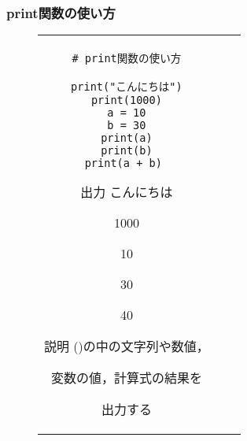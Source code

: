 \documentclass{jsarticle}
\begin{document}
\subsubsection{print関数の使い方} \vspace{-5mm}
\begin{figure}[h]
	\begin{tabular}{ccc}
		\begin{minipage}[t]{.4\textwidth}
			\begin{lstlisting}[caption=print関数]
# print関数の使い方

print("こんにちは")
print(1000)
a = 10
b = 30
print(a)
print(b)
print(a + b) \end{lstlisting}
		\end{minipage} \hspace{5mm}
		\begin{minipage}[t]{.15\textwidth}
			\begin{itembox}[l]{出力}
				こんにちは \par
				1000 \par
				10 \par
				30 \par
				40 \par
			\end{itembox}
		\end{minipage} \hspace{5mm}
		\begin{minipage}[t]{.3\textwidth}
			\begin{itembox}[l]{説明}
				()の中の文字列や数値，\par 変数の値，計算式の結果を \par
				出力する
			\end{itembox}
		\end{minipage}
	\end{tabular}
\end{figure}
\end{document}
